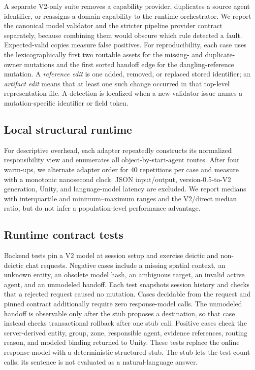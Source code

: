 A separate V2-only suite removes a capability provider, duplicates a source
agent identifier, or reassigns a domain capability to the runtime
orchestrator. We report the canonical model validator and the stricter
pipeline provider contract separately, because combining them would obscure
which rule detected a fault. Expected-valid copies measure false positives.
For reproducibility, each case uses the lexicographically first two routable
assets for the missing- and duplicate-owner mutations and the first sorted
handoff edge for the dangling-reference mutation. A \emph{reference edit} is
one added, removed, or replaced stored identifier; an \emph{artifact edit}
means that at least one such change occurred in that top-level representation
file. A detection is localized when a new validator issue names a
mutation-specific identifier or field token.

\subsection{Local structural runtime}

For descriptive overhead, each adapter repeatedly constructs its normalized
responsibility view and enumerates all object-by-start-agent routes. After four
warm-ups, we alternate adapter order for 40 repetitions per case and measure
with a monotonic nanosecond clock. JSON input/output, version-0.5-to-V2
generation, Unity, and language-model latency are excluded. We report medians
with interquartile and minimum--maximum ranges and the V2/direct median ratio,
but do not infer a population-level performance advantage.

\subsection{Runtime contract tests}

Backend tests pin a V2 model at session setup and exercise deictic and
non-deictic chat requests. Negative cases include a missing spatial context,
an unknown entity, an obsolete model hash, an ambiguous target, an invalid
active agent, and an unmodeled handoff. Each test snapshots session history and
checks that a rejected request caused no mutation. Cases decidable from the
request and pinned contract additionally require zero response-model calls. The
unmodeled handoff is observable only after the stub proposes a destination, so
that case instead checks transactional rollback after one stub call. Positive
cases check the server-derived entity, group, zone, responsible agent, evidence
references, routing reason, and modeled binding returned to Unity.
These tests replace the online response model with a deterministic structured
stub. The stub lets the test count calls; its sentence is not evaluated as a
natural-language answer.

